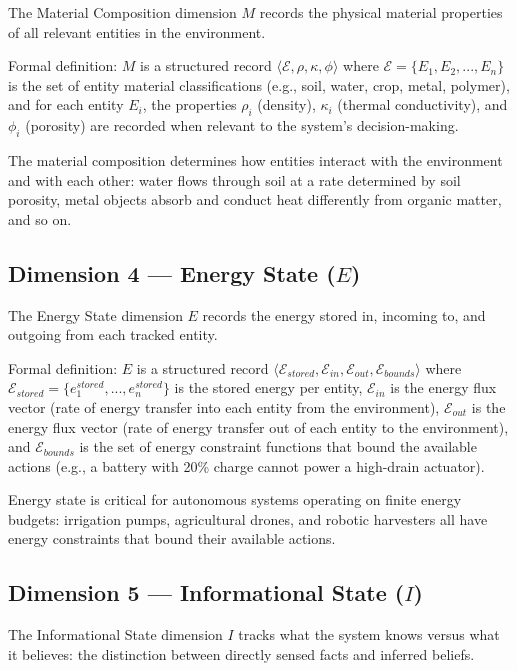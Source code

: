 \documentclass[12pt]{article}
\begin{document}
The Material Composition dimension $M$ records the physical material properties of all relevant entities in the environment.

Formal definition: $M$ is a structured record $\langle \mathcal{E}, \rho, \kappa, \phi \rangle$ where $\mathcal{E} = \{E_1, E_2, ..., E_n\}$ is the set of entity material classifications (e.g., soil, water, crop, metal, polymer), and for each entity $E_i$, the properties $\rho_i$ (density), $\kappa_i$ (thermal conductivity), and $\phi_i$ (porosity) are recorded when relevant to the system's decision-making.

The material composition determines how entities interact with the environment and with each other: water flows through soil at a rate determined by soil porosity, metal objects absorb and conduct heat differently from organic matter, and so on.

\subsection{Dimension 4 --- Energy State ($E$)}
\label{sec:energy}

The Energy State dimension $E$ records the energy stored in, incoming to, and outgoing from each tracked entity.

Formal definition: $E$ is a structured record $\langle \mathcal{E}_{stored}, \mathcal{E}_{in}, \mathcal{E}_{out}, \mathcal{E}_{bounds} \rangle$ where $\mathcal{E}_{stored} = \{e_1^{stored}, ..., e_n^{stored}\}$ is the stored energy per entity, $\mathcal{E}_{in}$ is the energy flux vector (rate of energy transfer into each entity from the environment), $\mathcal{E}_{out}$ is the energy flux vector (rate of energy transfer out of each entity to the environment), and $\mathcal{E}_{bounds}$ is the set of energy constraint functions that bound the available actions (e.g., a battery with 20\% charge cannot power a high-drain actuator).

Energy state is critical for autonomous systems operating on finite energy budgets: irrigation pumps, agricultural drones, and robotic harvesters all have energy constraints that bound their available actions.

\subsection{Dimension 5 --- Informational State ($I$)}
\label{sec:informational}

The Informational State dimension $I$ tracks what the system knows versus what it believes: the distinction between directly sensed facts and inferred beliefs.
\end{document}
